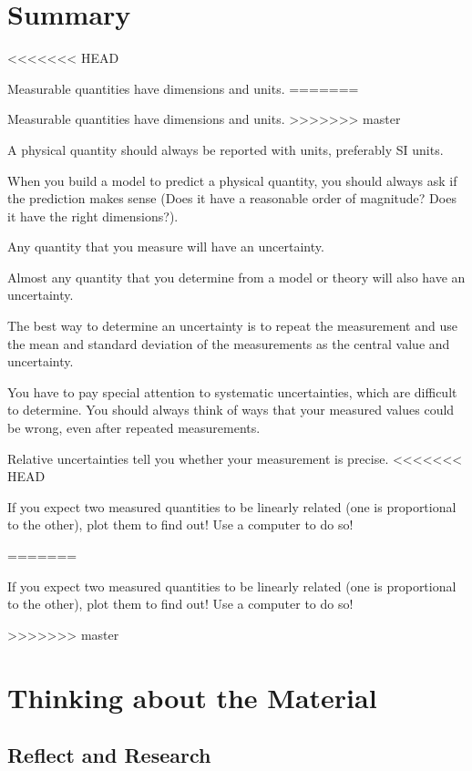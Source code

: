 \newpage
\section{Summary}
\vspace{2cm}
\begin{chapterSummary}
<<<<<<< HEAD
{\item Measurable quantities have dimensions and units.
=======
{
\item Measurable quantities have dimensions and units.
>>>>>>> master
\item A physical quantity should always be reported with units, preferably SI units.
\item When you build a model to predict a physical quantity, you should always ask if the prediction makes sense (Does it have a reasonable order of magnitude? Does it have the right dimensions?).
\item Any quantity that you measure will have an uncertainty.
\item Almost any quantity that you determine from a model or theory will also have an uncertainty.
\item The best way to determine an uncertainty is to repeat the measurement and use the mean and standard deviation of the measurements as the central value and uncertainty.
\item You have to pay special attention to systematic uncertainties, which are difficult to determine. You should always think of ways that your measured values could be wrong, even after repeated measurements.
\item Relative uncertainties tell you whether your measurement is precise.
<<<<<<< HEAD
\item If you expect two measured quantities to be linearly related (one is proportional to the other), plot them to find out! Use a computer to do so!}
=======
\item If you expect two measured quantities to be linearly related (one is proportional to the other), plot them to find out! Use a computer to do so!
}
>>>>>>> master
\end{chapterSummary}

\section{Thinking about the Material}

\subsection{Reflect and Research}


